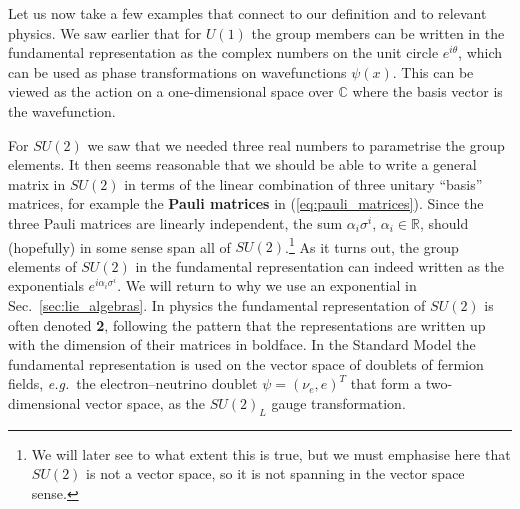 \documentclass[notes.tex]{subfiles}
\begin{document}
Let us now take a few examples that connect to our definition and to relevant physics. We saw earlier that for $U(1)$ the group members can be written in the fundamental representation as the complex numbers on the unit circle $e^{i \theta}$, which can be used as phase transformations on wavefunctions $\psi(x)$. This can be viewed as the action on a one-dimensional space over $\mathbb C$ where the basis vector is the wavefunction.

For $SU(2)$ we saw that we needed three real numbers to parametrise the group elements. It then seems reasonable that we should be able to write a general matrix in $SU(2)$ in terms of the linear combination of three unitary ``basis'' matrices, for example the {\bf Pauli matrices} in (\ref{eq:pauli_matrices}). Since the three Pauli matrices are linearly independent, the sum $\alpha_i\sigma^i$, $\alpha_i\in\mathbb R$, should (hopefully) in some sense span all of $SU(2)$.\footnote{We will later see to what extent this is true, but we must emphasise here that $SU(2)$ is not a vector space, so it is not spanning in the vector space sense.} As it turns out, the group elements of $SU(2)$ in the fundamental representation can indeed written as the exponentials  $e^{i \alpha_i \sigma^i}$. We will return to why we use an exponential in Sec.~\ref{sec:lie_algebras}. In physics the fundamental representation of $SU(2)$ is often denoted {\bf 2}, following the pattern that the representations are written up with the dimension of their matrices in boldface. In the Standard Model the fundamental representation is used on the vector space of doublets of fermion fields, {\it e.g.}\ the electron--neutrino doublet $\psi = (\nu_e, e)^T$ that form a two-dimensional vector space, as the $SU(2)_L$ gauge transformation. 
\end{document}
